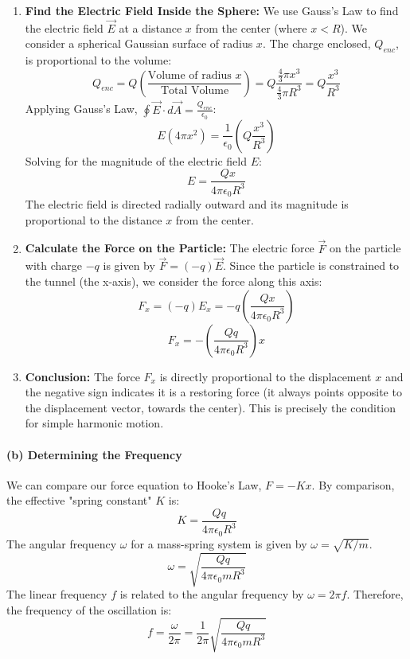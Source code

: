\documentclass{article}
\begin{document}
\begin{enumerate}
    \item \textbf{Find the Electric Field Inside the Sphere:} We use Gauss's Law to find the electric field $\vec{E}$ at a distance $x$ from the center (where $x < R$). We consider a spherical Gaussian surface of radius $x$. The charge enclosed, $Q_{enc}$, is proportional to the volume:
    $$ Q_{enc} = Q \left( \frac{\text{Volume of radius } x}{\text{Total Volume}} \right) = Q \frac{\frac{4}{3}\pi x^3}{\frac{4}{3}\pi R^3} = Q \frac{x^3}{R^3} $$
    Applying Gauss's Law, $\oint \vec{E} \cdot d\vec{A} = \frac{Q_{enc}}{\epsilon_0}$:
    $$ E (4\pi x^2) = \frac{1}{\epsilon_0} \left( Q \frac{x^3}{R^3} \right) $$
    Solving for the magnitude of the electric field $E$:
    $$ E = \frac{Qx}{4\pi\epsilon_0 R^3} $$
    The electric field is directed radially outward and its magnitude is proportional to the distance $x$ from the center.

    \item \textbf{Calculate the Force on the Particle:} The electric force $\vec{F}$ on the particle with charge $-q$ is given by $\vec{F} = (-q)\vec{E}$. Since the particle is constrained to the tunnel (the x-axis), we consider the force along this axis:
    $$ F_x = (-q) E_x = -q \left( \frac{Qx}{4\pi\epsilon_0 R^3} \right) $$
    $$ F_x = -\left( \frac{Qq}{4\pi\epsilon_0 R^3} \right) x $$
    
    \item \textbf{Conclusion:} The force $F_x$ is directly proportional to the displacement $x$ and the negative sign indicates it is a restoring force (it always points opposite to the displacement vector, towards the center). This is precisely the condition for simple harmonic motion.
\end{enumerate}

\paragraph{(b) Determining the Frequency}
We can compare our force equation to Hooke's Law, $F = -Kx$. By comparison, the effective "spring constant" $K$ is:
$$ K = \frac{Qq}{4\pi\epsilon_0 R^3} $$
The angular frequency $\omega$ for a mass-spring system is given by $\omega = \sqrt{K/m}$.
$$ \omega = \sqrt{\frac{Qq}{4\pi\epsilon_0 m R^3}} $$
The linear frequency $f$ is related to the angular frequency by $\omega = 2\pi f$. Therefore, the frequency of the oscillation is:
$$ f = \frac{\omega}{2\pi} = \frac{1}{2\pi} \sqrt{\frac{Qq}{4\pi\epsilon_0 m R^3}} $$
\end{document}
